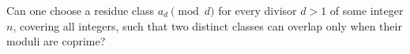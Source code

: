 Can one choose a residue class $a_d\pmod d$ for every divisor $d>1$ of some integer $n$, covering all integers, such that two distinct classes can overlap only when their moduli are coprime?
